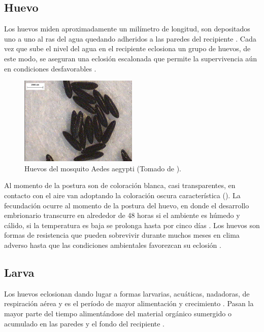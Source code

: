 \subsection{Huevo}
\label{subsec:ciclo-biologico-huevo}
Los huevos miden aproximadamente un milímetro de longitud, son depositados uno a uno al ras del agua quedando adheridos a las paredes del recipiente \cite{ThironIzcazaJ2003}. Cada vez que sube el
nivel del agua en el recipiente eclosiona un grupo de huevos, de este modo, se aseguran una
eclosión escalonada que permite la supervivencia aún en condiciones desfavorables
\cite{directricesDetvArg}.

\begin{figure}
\centering
\includegraphics[width=0.5\textwidth]{capitulo-3/graphics/huevos.png}
\caption{\label{fig:cap3-huevos} Huevos del mosquito Aedes aegypti (Tomado de
\cite{sivanathan2006ecology}).}
\end{figure}

Al momento de la postura son de coloración blanca, casi transparentes, en contacto con el aire van
adoptando la coloración oscura característica \cite{directricesDetvArg} ().
La fecundación ocurre al momento de la postura del huevo, en donde el desarrollo embrionario
transcurre en alrededor de 48 horas si el ambiente es húmedo y cálido, si la temperatura es baja
se prolonga hasta por cinco días \cite{ThironIzcazaJ2003}. Los huevos son formas de resistencia que
pueden sobrevivir durante muchos meses en clima adverso hasta que las condiciones ambientales
favorezcan su eclosión \cite{directricesDetvArg}.

\subsection{Larva}
\label{subsec:ciclo-biologico-larva}
Los huevos eclosionan dando lugar a formas larvarias, acuáticas, nadadoras, de respiración aérea
\cite{directricesDetvArg} y es el período de mayor alimentación y crecimiento
\cite{web-site:gMonteroBiologia}. Pasan la mayor parte del tiempo alimentándose del material
orgánico sumergido o acumulado en las paredes y el fondo del recipiente
\cite{web-site:gMonteroBiologia, directricesDetvArg}.

